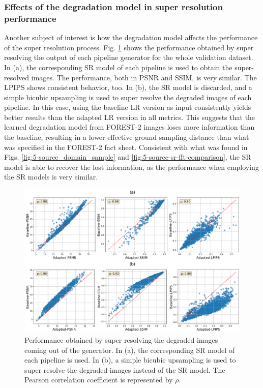         \subsubsection{Effects of the degradation model in super resolution performance}

        Another subject of interest is how the degradation model affects the performance of the super resolution process.
        Fig. \ref{fig:5-source-domain-comparison} shows the performance obtained by super resolving the output of each pipeline generator for the whole validation dataset.
        In (a), the corresponding SR model of each pipeline is used to obtain the super-resolved images. 
        The performance, both in PSNR and SSIM, is very similar. The LPIPS shows consistent behavior, too.
        In (b), the SR model is discarded, and a simple bicubic upsampling is used to super resolve the degraded images of each pipeline. 
        In this case, using the baseline LR version as input consistently yields better results than the adapted LR version in all metrics.
        This suggests that the learned degradation model from FOREST-2 images loses more information than the baseline, resulting in a lower effective ground sampling distance than what was specified in the FOREST-2 fact sheet.
        Consistent with what was found in Figs. \ref{fig:5-source_domain_sample} and \ref{fig:5-source-sr-fft-comparison}, the SR model is able to recover the lost information, as the performance when employing the SR models is very similar. 
        
        \begin{figure}[H]
            \centering
            \includegraphics[width=\textwidth]{Includes/5-source-domain-comparison.png}
            \caption{Performance obtained by super resolving the degraded images coming out of the generator. 
                     In (a), the corresponding SR model of each pipeline is used. 
                     In (b), a simple bicubic upsampling is used to super resolve the degraded images instead of the SR model. The Pearson correlation coefficient is represented by $\rho$. }
            \label{fig:5-source-domain-comparison}
        \end{figure}

